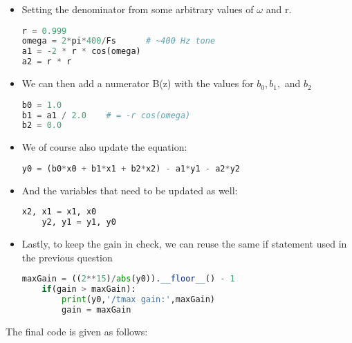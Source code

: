 \documentclass[11pt]{article}
\begin{document}
\begin{itemize}
    \item Setting the denominator from some arbitrary values of $\omega$ and r.\\
\begin{lstlisting}[language=python, breaklines=true]
r = 0.999
omega = 2*pi*400/Fs      # ~400 Hz tone
a1 = -2 * r * cos(omega)
a2 = r * r
\end{lstlisting}            

    \item We can then add a numerator B(z) with the values for $b_0, b_1, $ and $b_2$\\
\begin{lstlisting}[language=python, breaklines=true]
b0 = 1.0
b1 = a1 / 2.0    # = -r cos(omega)
b2 = 0.0
\end{lstlisting}            

    \item We of course also update the equation:
\begin{lstlisting}[language=python, breaklines=true]
y0 = (b0*x0 + b1*x1 + b2*x2) - a1*y1 - a2*y2
\end{lstlisting}            
    
\item And the variables that need to be updated as well:
\begin{lstlisting}[language=python, breaklines=true]
x2, x1 = x1, x0
    y2, y1 = y1, y0

\end{lstlisting}            

\item Lastly, to keep the gain in check, we can reuse the same if statement used in the previous question
\begin{lstlisting}[language=python, breaklines=true]
maxGain = ((2**15)/abs(y0)).__floor__() - 1
    if(gain > maxGain):
        print(y0,'/tmax gain:',maxGain)
        gain = maxGain
\end{lstlisting}           

\end{itemize}
\pagebreak
The final code is given as follows:
\end{document}
